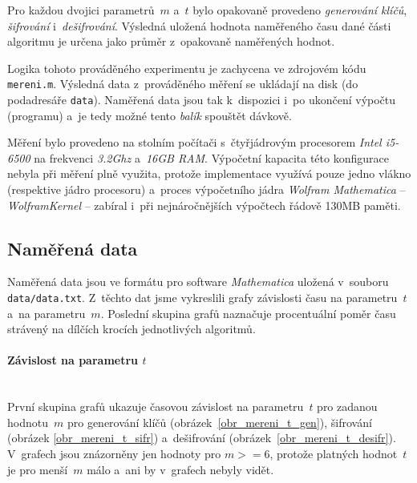 \documentclass[thesis=M,czech,hidelinks]{FITthesis}[2012/06/26]
\newcommand{\0}{{\textcolor[gray]{0.75}{0}}}
\begin{document}
Pro každou dvojici parametrů~$m$ a~$t$ bylo opakovaně provedeno \emph{generování
klíčů}, \emph{šifrování} i~\emph{dešifrování}. Výsledná uložená hodnota
naměřeného času dané části algoritmu je určena jako průměr z~opakovaně
naměřených hodnot.

Logika tohoto prováděného experimentu je zachycena ve zdrojovém kódu
\texttt{mereni.m}. Výsledná data z~prováděného měření se ukládají na disk (do
podadresáře \texttt{data}). Naměřená data jsou tak k~dispozici i~po ukončení
výpočtu (programu) a~je tedy možné tento \emph{balík} spouštět dávkově.

Měření bylo provedeno na stolním počítači s~čtyřjádrovým procesorem \emph{Intel
i5-6500} na frekvenci \emph{3.2\;Ghz} a~\emph{16\;GB RAM}. Výpočetní kapacita
této konfigurace nebyla při měření plně využita, protože implementace využívá
pouze jedno vlákno (respektive jádro procesoru) a~proces výpočetního jádra
\emph{Wolfram Mathematica} -- \emph{WolframKernel} -- zabíral i~při
nejnáročnějších výpočtech řádově 130\;MB paměti.


\subsection{Naměřená data}

Naměřená data jsou ve formátu pro software \emph{Mathematica} uložená v~souboru
\texttt{data/data.txt}. Z~těchto dat jsme vykreslili grafy závislosti času na
parametru~$t$ a~na parametru~$m$. Poslední skupina grafů naznačuje procentuální
poměr času strávený na dílčích krocích jednotlivých algoritmů.


\paragraph{Závislost na parametru $t$} \hfil \\
První skupina grafů ukazuje časovou závislost na parametru~$t$ pro zadanou
hodnotu~$m$ pro generování klíčů (obrázek~\ref{obr_mereni_t_gen}), šifrování
(obrázek \ref{obr_mereni_t_sifr}) a~dešifrování
(obrázek~\ref{obr_mereni_t_desifr}). V~grafech jsou znázorněny jen hodnoty pro
$m>=6$, protože platných hodnot~$t$ je pro menší~$m$ málo a~ani by v~grafech
nebyly vidět.

\vfil
\end{document}
